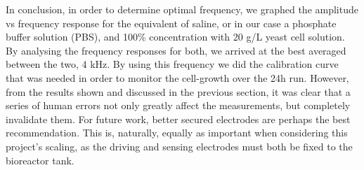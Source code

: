 In conclusion, in order to determine optimal frequency, we graphed the amplitude vs frequency response for the equivalent of saline, or in our case a phosphate buffer solution (PBS), and 100\% concentration with 20 g/L yeast cell solution.
By analysing the frequency responses for both, we arrived at the best averaged between the two, 4 kHz.
By using this frequency we did the calibration curve that was needed in order to monitor the cell-growth over the 24h run. However, from the results shown and discussed in the previous section, it was clear that a series of human errors not only greatly affect the measurements, but completely invalidate them.
For future work, better secured electrodes are perhaps the best recommendation. This is, naturally, equally as important when considering this project's scaling, as the driving and sensing electrodes must both be fixed to the bioreactor tank.